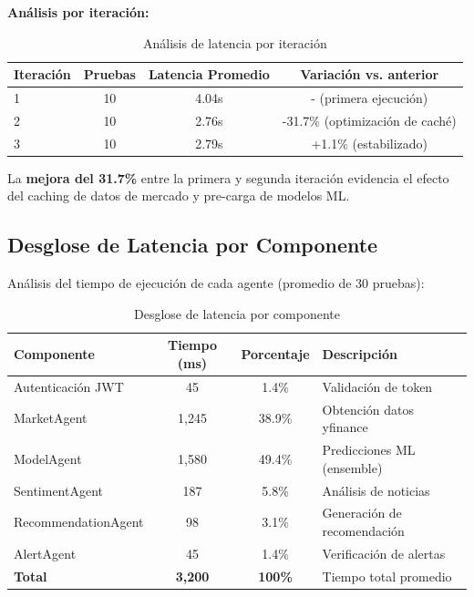 \documentclass[12pt,a4paper]{report}
\begin{document}
\textbf{Análisis por iteración:}

\begin{table}[H]
\centering
\caption{Análisis de latencia por iteración}
\label{tab:iteraciones}
\begin{tabular}{lccc}
\toprule
\textbf{Iteración} & \textbf{Pruebas} & \textbf{Latencia Promedio} & \textbf{Variación vs. anterior} \\
\midrule
1 & 10 & 4.04s & - (primera ejecución) \\
2 & 10 & 2.76s & -31.7\% (optimización de caché) \\
3 & 10 & 2.79s & +1.1\% (estabilizado) \\
\bottomrule
\end{tabular}
\end{table}

La \textbf{mejora del 31.7\%} entre la primera y segunda iteración evidencia el efecto del caching de datos de mercado y pre-carga de modelos ML.

\subsection{Desglose de Latencia por Componente}

Análisis del tiempo de ejecución de cada agente (promedio de 30 pruebas):

\begin{table}[H]
\centering
\caption{Desglose de latencia por componente}
\label{tab:latencia-componentes}
\begin{tabular}{lccp{5.5cm}}
\toprule
\textbf{Componente} & \textbf{Tiempo (ms)} & \textbf{Porcentaje} & \textbf{Descripción} \\
\midrule
Autenticación JWT & 45 & 1.4\% & Validación de token \\
MarketAgent & 1,245 & 38.9\% & Obtención datos yfinance \\
ModelAgent & 1,580 & 49.4\% & Predicciones ML (ensemble) \\
SentimentAgent & 187 & 5.8\% & Análisis de noticias \\
RecommendationAgent & 98 & 3.1\% & Generación de recomendación \\
AlertAgent & 45 & 1.4\% & Verificación de alertas \\
\midrule
\textbf{Total} & \textbf{3,200} & \textbf{100\%} & Tiempo total promedio \\
\bottomrule
\end{tabular}
\end{table}
\end{document}
